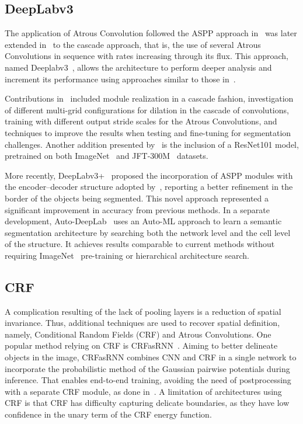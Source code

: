 \documentclass[sensors,article,accept,moreauthors,pdftex]{Definitions/mdpi}
\begin{document}
\subsection{DeepLabv3}
The application of Atrous Convolution followed the ASPP approach in~\cite{DeepLab} was later extended in~\cite{Rethinking} to the cascade approach, that is, the use of several Atrous Convolutions in sequence with rates increasing through its flux.
This approach, named Deeplabv3~\cite{Rethinking}, allows the architecture to perform deeper analysis and increment its performance using approaches similar to those in~\cite{Deformable}.

Contributions in~\cite{Rethinking} included module realization in a cascade fashion, investigation of different multi-grid configurations for dilation in the cascade of convolutions, training with different output stride scales for the Atrous Convolutions, and techniques to improve the results when testing and fine-tuning for segmentation challenges. Another addition presented by~\cite{Rethinking} is the inclusion of a ResNet101 model, pretrained on both ImageNet~\cite{ImageNet} and JFT-300M~\cite{Revisiting} datasets.

More recently, DeepLabv3+~\cite{DeepLabv3+} proposed the incorporation of ASPP modules with the encoder--decoder structure adopted by~\cite{Segnet}, reporting a better refinement in the border of the objects being segmented. This novel approach represented a significant improvement in accuracy from previous methods. In a separate development, Auto-DeepLab~\cite{Auto-DeepLab} uses an Auto-ML approach to learn a semantic segmentation architecture by searching both the network level and the cell level of the structure. It achieves results comparable to current methods without requiring ImageNet~\cite{ImageNet} pre-training or hierarchical architecture search.

\subsection{CRF}
A complication resulting of the lack of pooling layers is a reduction of spatial invariance.
Thus, additional techniques are used to recover  spatial definition, namely, Conditional Random Fields (CRF) and Atrous Convolutions. One popular method relying on CRF is CRFasRNN~\cite{CRFasRNN}. Aiming to better delineate objects in the image, CRFasRNN combines CNN and CRF in a single network to incorporate the probabilistic method of the Gaussian pairwise potentials during inference. That enables  end-to-end training, avoiding the need of postprocessing with a separate CRF module, as done in~\cite{DeepLab}. A limitation of architectures using CRF is that CRF has difficulty capturing delicate boundaries, as they have low confidence in the unary term of the CRF energy function.
\end{document}
